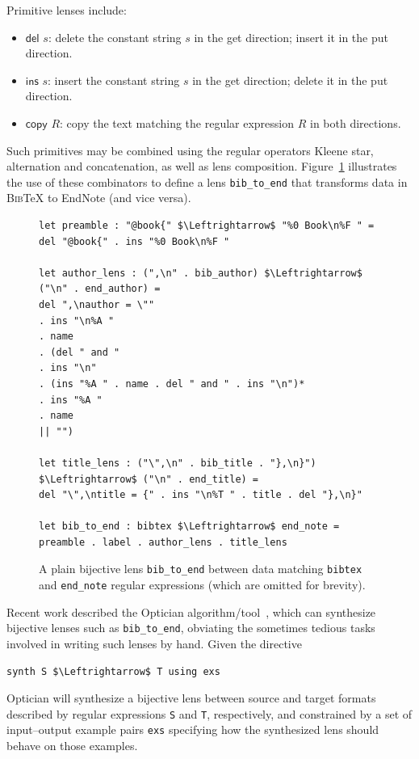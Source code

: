 \documentclass[acmsmall,review,anonymous]{acmart}
\newcommand{\kw}[1]{\textcolor{dkblue}{\ensuremath{\mathsf{#1}}}}
\newcommand{\bibtex}{\textsc{Bib}\TeX{}}
\newcommand{\cd}[1]{\lstinline[backgroundcolor=\color{white}]$#1$}
\begin{document}
Primitive lenses include:
\begin{itemize}
  \item \kw{del} $s$: delete the constant string $s$ in the get
  direction; insert it in the put direction.
  \item \kw{ins} $s$: insert the constant string $s$ in the get
  direction; delete it in the put direction.
  \item \kw{copy} $R$: copy the text matching the regular expression $R$ in
  both directions.
\end{itemize}
Such primitives may be combined using the regular operators
Kleene star, alternation and concatenation, as well as lens composition.
Figure~\ref{fig:example-lens} illustrates the use of these
combinators to define a lens \cd{bib_to_end} that transforms data
in \bibtex{} to EndNote (and vice versa). 
\begin{figure}[t]
\begin{lstlisting}
let preamble : "@book{" $\Leftrightarrow$ "%0 Book\n%F " =
del "@book{" . ins "%0 Book\n%F "

let author_lens : (",\n" . bib_author) $\Leftrightarrow$ ("\n" . end_author) =
del ",\nauthor = \""
. ins "\n%A "
. name
. (del " and "
. ins "\n"
. (ins "%A " . name . del " and " . ins "\n")*
. ins "%A "
. name
|| "")

let title_lens : ("\",\n" . bib_title . "},\n}") $\Leftrightarrow$ ("\n" . end_title) =
del "\",\ntitle = {" . ins "\n%T " . title . del "},\n}"

let bib_to_end : bibtex $\Leftrightarrow$ end_note = preamble . label . author_lens . title_lens
\end{lstlisting}
\caption{A plain bijective lens \cd{bib_to_end} between data
matching \cd{bibtex} and \cd{end_note} regular 
expressions (which are omitted for brevity).  
}
\label{fig:example-lens}
\end{figure}

Recent work described the Optician
algorithm/tool~\cite{optician}, which can synthesize bijective lenses
such as \cd{bib_to_end}, obviating the sometimes tedious tasks
involved in writing such lenses by hand.  Given the directive
\begin{lstlisting}
synth S $\Leftrightarrow$ T using exs
\end{lstlisting}
\noindent
Optician will synthesize a bijective lens between 
source and target formats described by regular expressions
\cd{S} and \cd{T}, respectively, and constrained by a set of input--output example pairs \cd{exs} specifying how
the synthesized lens should behave on those examples.
\end{document}
